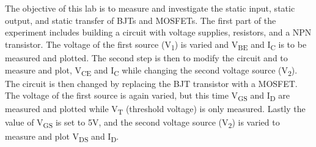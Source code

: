The objective of this lab is to measure and investigate the static input, static output, and static transfer of BJTs and MOSFETs. The first part of the experiment includes building a circuit with voltage supplies, resistors, and a NPN transistor. The voltage of the first source (V\textsubscript{1}) is varied and V\textsubscript{BE} and I\textsubscript{C} is to be measured and plotted. The second step is then to modify the circuit and to measure and plot, V\textsubscript{CE} and I\textsubscript{C} while changing the second voltage source (V\textsubscript{2}). The circuit is then changed by replacing the BJT transistor with a MOSFET. The voltage of the first source is again varied, but this time V\textsubscript{GS} and I\textsubscript{D} are measured and plotted while V\textsubscript{T} (threshold voltage) is only measured. Lastly the value of V\textsubscript{GS} is set to 5V, and the second voltage source (V\textsubscript{2}) is varied to measure and plot V\textsubscript{DS} and I\textsubscript{D}. \\
